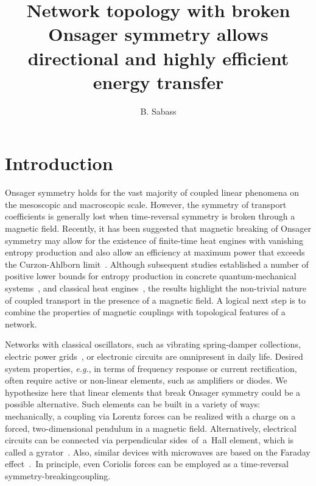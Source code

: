 \documentclass[doublecol,final,edchoice]{epl2}
\title{Network topology with broken Onsager symmetry allows\\
directional and highly efficient energy transfer\vspace*{-6.3pt}}
\author{B. Sabass}
\institute{Mechanical and Aerospace Engineering, Princeton University - Princeton, NJ, USA}
\begin{document}
\maketitle

\section{Introduction}

Onsager symmetry holds for the vast majority of coupled linear phenomena on the mesoscopic and macroscopic scale. However, the symmetry of transport coefficients is generally lost when time-reversal symmetry is broken through a magnetic field. Recently, it has been suggested that magnetic breaking of Onsager symmetry may allow for the existence of finite-time heat engines with vanishing entropy production and also allow an efficiency at maximum power that exceeds the Curzon-Ahlborn limit~\cite{epl17030bib1}. Although subsequent studies established a number of positive lower bounds for entropy production in concrete quantum-mechanical systems~\cite{epl17030bib2,epl17030bib3,epl17030bib4, epl17030bib5}, and classical heat engines~\cite{epl17030bib6, epl17030bib7}, the results highlight the non-trivial nature of coupled transport in the presence of a magnetic field. A logical next step is to combine the properties of magnetic couplings with topological features of a network.

Networks with classical oscillators, such as vibrating spring-damper collections, electric power grids~\cite{epl17030bib8, epl17030bib9}, or electronic circuits are omnipresent in daily life. Desired system properties, \textit{e.g.}, in terms of frequency response or current rectification, often require active or non-linear elements, such as amplifiers or diodes. We hypothesize here that linear elements that break Onsager symmetry could be a possible alternative. Such elements can be built in a variety of ways: mechanically, a coupling via Lorentz forces can be realized with a charge on a forced, two-dimensional pendulum in a magnetic field. Alternatively, electrical circuits can be connected via perpendicular sides~of~a~Hall element, which is called a gyrator~\cite{epl17030bib10,epl17030bib11, epl17030bib12}. Also, similar devices with microwaves are based on the Faraday effect~\cite{epl17030bib13}.~In principle, even Coriolis forces can be employed as a time-reversal symmetry-breaking\break coupling.
\end{document}
